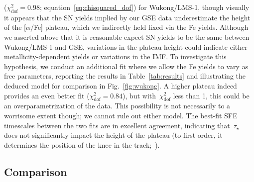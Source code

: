 \documentclass[ms.tex]{subfiles}
\begin{document}
($\chi_\text{dof}^2 = 0.98$; equation~\ref{eq:chisquared_dof}) for Wukong/LMS-1,
though visually it appears that the SN yields implied by our GSE data
underestimate the height of the [$\alpha$/Fe] plateau, which we indirectly
held fixed via the Fe yields.
Although we asserted above that it is reasonable expect SN yields to be the
same between Wukong/LMS-1 and GSE, variations in the plateau height could
indicate either metallicity-dependent yields or variations in the IMF.
To investigate this hypothesis, we conduct an additional fit where we allow
the Fe yields to vary as free parameters, reporting the results in
Table~\ref{tab:results} and illustrating the deduced model for comparison in
Fig.~\ref{fig:wukong}.
A higher plateau indeed provides an even better fit
($\chi_\text{dof}^2 = 0.84$), but with~$\chi_\text{dof}^2$ less than 1, this
could be an overparametrization of the data.
This possibility is not necessarily to a worrisome extent though; we cannot
rule out either model.
The best-fit SFE timescales between the two fits are in excellent agreement,
indicating that~$\tau_\star$ does not significantly impact the height of the
plateau (to first-order, it determines the position of the knee in the
track;~\citealp{Weinberg2017}).

\subsection{Comparison}
\label{sec:h3:comparison}
\end{document}
